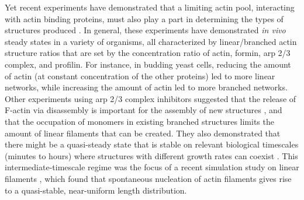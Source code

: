 \documentclass[11pt]{article}
\begin{document}
Yet recent experiments have demonstrated that a limiting actin pool, interacting with actin binding proteins, must also play a part in determining the types of structures produced \cite{burke2014homeostatic, suarez2016internetwork, chan2019arp2, xie2021combinatorial, xu2023cooperative}. In general, these experiments have demonstrated \emph{in vivo} steady states in a variety of organisms, all characterized by linear/branched actin structure ratios that are set by the concentration ratio of actin, formin, arp 2/3 complex, and profilin. For instance, in budding yeast cells, reducing the amount of actin (at constant concentration of the other proteins) led to more linear networks, while increasing the amount of actin led to more branched networks. Other experiments using arp 2/3 complex inhibitors \cite{burke2014homeostatic} suggested that the release of F-actin via disassembly is important for the assembly of new structures \cite{suarez2016internetwork}, and that the occupation of monomers in existing branched structures limits the amount of linear filaments that can be created. They also demonstrated that there might be a quasi-steady state that is stable on relevant biological timescales (minutes to hours) where structures with different growth rates can coexist \cite{hu2007theoretical,suarez2017enough}. This intermediate-timescale regime was the focus of a recent simulation study on linear filaments \cite{banerjee2022emergence}, which found that spontaneous nucleation of actin filaments gives rise to a quasi-stable, near-uniform length distribution.%

\end{document}
